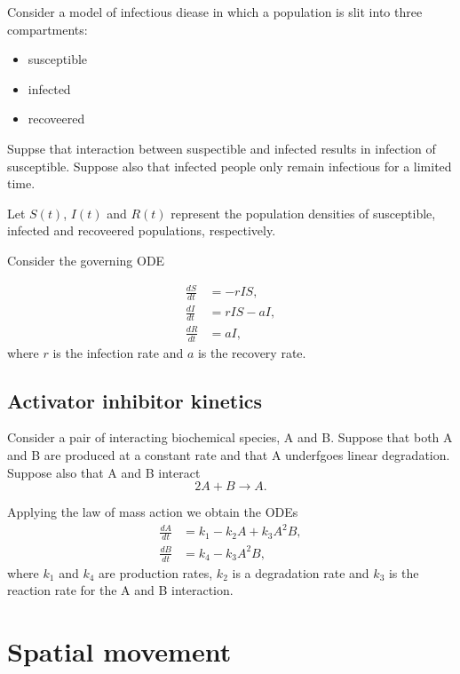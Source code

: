 \documentclass[
  letterpaper,
  DIV=11,
  numbers=noendperiod]{scrreprt}
\providecommand{\tightlist}{%
  \setlength{\itemsep}{0pt}\setlength{\parskip}{0pt}}\usepackage{longtable,booktabs,array}
\theoremstyle{plain}
\theoremstyle{definition}
\theoremstyle{plain}
\theoremstyle{remark}
\begin{document}
Consider a model of infectious diease in which a population is slit into
three compartments:

\begin{itemize}
\tightlist
\item
  susceptible
\item
  infected
\item
  recoveered
\end{itemize}

Suppse that interaction between suspectible and infected results in
infection of susceptible. Suppose also that infected people only remain
infectious for a limited time.

Let \(S(t)\), \(I(t)\) and \(R(t)\) represent the population densities
of susceptible, infected and recoveered populations, respectively.

Consider the governing ODE

\[
\begin{aligned}
\frac{d S}{ dt} &= -rIS, \\
\frac{d I}{ dt} &= rIS - aI, \\
\frac{d R}{ dt} &= aI,
\end{aligned}
\] where \(r\) is the infection rate and \(a\) is the recovery rate.

\hypertarget{activator-inhibitor-kinetics}{%
\subsection{Activator inhibitor
kinetics}\label{activator-inhibitor-kinetics}}

Consider a pair of interacting biochemical species, A and B. Suppose
that both A and B are produced at a constant rate and that A underfgoes
linear degradation. Suppose also that A and B interact \[
2A+B \rightarrow A.
\]

Applying the law of mass action we obtain the ODEs \[
\begin{aligned}
\frac{d A}{ dt} &= k_1 - k_2 A + k_3 A^2 B,  \\
\frac{d B}{ dt} &= k_4 - k_3 A^2 B,
\end{aligned}
\] where \(k_1\) and \(k_4\) are production rates, \(k_2\) is a
degradation rate and \(k_3\) is the reaction rate for the A and B
interaction.

\hypertarget{spatial-movement}{%
\section{Spatial movement}\label{spatial-movement}}
\end{document}
